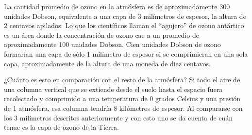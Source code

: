 La cantidad promedio de ozono en la atmósfera es de aproximadamente 300 unidades Dobson, equivalente a una capa de 3 milímetros de espesor, la altura de 2 centavos apilados. Lo que los científicos llaman el ``agujero'' de ozono antártico es un área donde la concentración de ozono cae a un promedio de aproximadamente 100 unidades Dobson. Cien unidades Dobson de ozono formarían una capa de sólo 1 milímetro de espesor si se comprimieran en una sola capa, aproximadamente de la altura de una moneda de diez centavos.

¿Cuánto es esto en comparación con el resto de la atmósfera? Si todo el aire de una columna vertical que se extiende desde el suelo hasta el espacio fuera recolectado y comprimido a una temperatura de 0 grados Celsius y una presión de 1 atmósfera, esa columna tendría 8 kilómetros de espesor. Al compararse con los 3 milímetros descritos anteriormente y con esto uno se da cuenta de cuán tenue es la capa de ozono de la Tierra.
